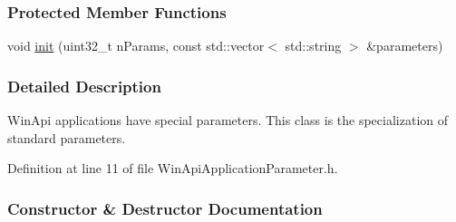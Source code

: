 \subsubsection*{Protected Member Functions}
\begin{DoxyCompactItemize}
\item 
void \hyperlink{a00071_aaf7d27892d7fbad5573099a4fabb6218}{init} (uint32\+\_\+t n\+Params, const std\+::vector$<$ std\+::string $>$ \&parameters)
\end{DoxyCompactItemize}


\subsubsection{Detailed Description}
Win\+Api applications have special parameters. This class is the specialization of standard parameters. 

Definition at line 11 of file Win\+Api\+Application\+Parameter.\+h.



\subsubsection{Constructor \& Destructor Documentation}
